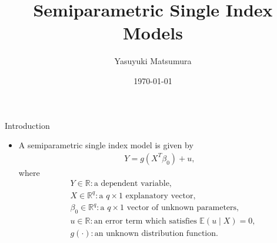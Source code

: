 \documentclass[xcolor=svgnames,dvipdfmx,cjk]{beamer}
\theoremstyle{example}
\begin{document}
 

\title[Li and Racine (2007, Chapter 8)]{Semiparametric Single Index Models} 
\author[Y. Matsumura]{Yasuyuki Matsumura}          
\date{\today}


\begin{frame}                  
\titlepage                     
\end{frame}




\begin{frame}{Introduction}
  \begin{itemize}
    \item  \alert{A semiparametric single index model} is given by 
            \begin{align*}
              Y = g (X^{T} \beta_0) + u,
            \end{align*}
           where  
            \begin{align*}
              & Y \in \mathbb{R}: \text{a dependent variable}, \\
              & X \in \mathbb{R}^{q}: \text{a }  q \times 1 \text{ explanatory vector}, \\
              & \beta_0 \in \mathbb{R}^{q}: \text{a }  q \times 1 \text{ vector of unknown parameters}, \\
              & u \in \mathbb{R}: \text{an error term which satisfies } \mathbb{E}(u \mid X) =0, \\
              & g(\cdot): \text{an unknown distribution function}.
            \end{align*}
  \end{itemize}
\end{frame}
\end{document}

